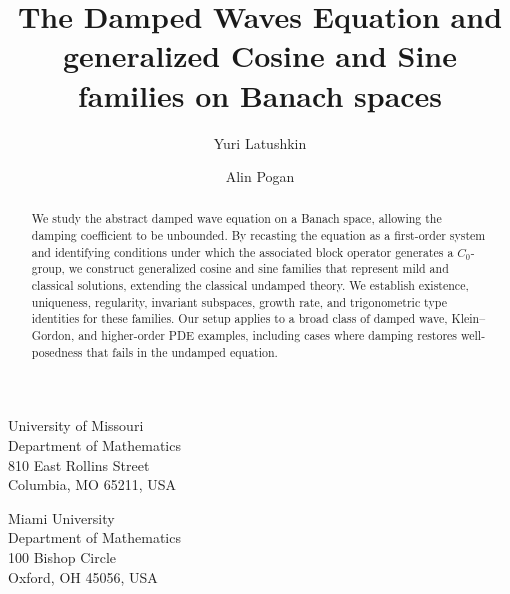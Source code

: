 \documentclass[11pt]{amsart}
\title{The Damped Waves Equation and generalized Cosine and Sine families on Banach spaces}
\author{ Yuri Latushkin}
\author{Alin Pogan}
\numberwithin{equation}{section}
\theoremstyle{remark}
\theoremstyle{definition}
\begin{document}
	
	
	
	
\begin{abstract}
We study the abstract damped wave equation on a Banach space, allowing the damping coefficient to be unbounded. By recasting the equation as a first-order system and identifying conditions under which the associated block operator generates a $C_0$-group, we construct generalized cosine and sine families that represent mild and classical solutions, extending the classical undamped theory. We establish existence, uniqueness, regularity, invariant subspaces, growth rate, and trigonometric type identities for these families. Our setup applies to a broad class of damped wave, Klein--Gordon, and higher-order PDE examples, including cases where damping restores well-posedness that fails in the undamped equation. 
\end{abstract}
	
	
	
	
	\maketitle
	
	
	\vspace{0.3cm}
	\begin{minipage}[h]{0.48\textwidth}
		\begin{center}
			University of Missouri \\
			Department of Mathematics\\
			810 East Rollins Street\\ Columbia, MO 65211, USA
		\end{center}
	\end{minipage}
	\begin{minipage}[h]{0.48\textwidth}
		\begin{center}
			Miami University\\
			Department of Mathematics\\
			100 Bishop Circle\\
			Oxford, OH 45056, USA
		\end{center}
	\end{minipage}
	
	\vspace{0.3cm}
	
	
	
	
	
	
\end{document}
